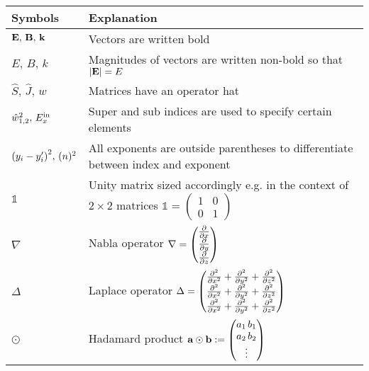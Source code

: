 \begingroup
\renewcommand{\arraystretch}{1.5}
\begin{tabular}{m{4cm} l}
Symbols & Explanation \\
\midrule
$\vb E, \, \vb B, \, \vb k$ & Vectors are written bold \\
$E, \, B, \, k $ &
Magnitudes of vectors are written non-bold so that $\qty|\vb E| = E$ \\
$\hat S, \, \hat J, \, \hat w$ & Matrices have an operator hat \\
$\hat w^2_{1,2}, \, E^{\mathrm{in}}_x$ & Super and sub indices are used to specify certain elements \\
$\qty(y_i - y_i')^2, \, (n)^2$ & All exponents are outside parentheses to differentiate between index and exponent \\
$\mathds 1$ & Unity matrix sized accordingly e.g. in the context of $2 \times 2$ matrices
$\mathds 1 = 
\begin{pmatrix}
    1 & 0\\
    0 & 1
\end{pmatrix}$\\
$\nabla$ & Nabla operator
$\nabla
= \begin{pmatrix}
    \pdv x \\
    \pdv y \\
    \pdv z
\end{pmatrix}$ \\
$\Delta$ & Laplace operator $\Delta =
\begin{pmatrix}
    \pdv[2] x + \pdv[2] y + \pdv[2] z \\
    \pdv[2] x + \pdv[2] y + \pdv[2] z \\
    \pdv[2] x + \pdv[2] y + \pdv[2] z 
\end{pmatrix}$\\
$\odot$ & Hadamard product
    $\vb a \odot \vb b :=
    \begin{pmatrix}
        a_1 \, b_1 \\
        a_2 \, b_2 \\
        \vdots
    \end{pmatrix}$\\
\end{tabular}
\endgroup
